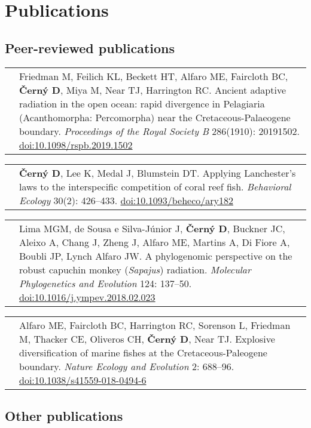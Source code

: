 \documentclass[10pt]{article}
\begin{document}
\section*{Publications}

\subsection*{Peer-reviewed publications}

\begin{tabularx}{\textwidth}{>{\raggedleft\arraybackslash}p{2.2cm} X}
2019 & Friedman M, Feilich KL, Beckett HT, Alfaro ME, Faircloth BC, \textbf{\v{C}ern\'{y} D}, Miya M, Near TJ, Harrington RC. Ancient adaptive radiation in the open ocean: rapid divergence in Pelagiaria (Acanthomorpha: Percomorpha) near the Cretaceous-Palaeogene boundary. \textit{Proceedings of the Royal Society B} 286(1910): 20191502. \href{http://doi.org/10.1098/rspb.2019.1502}{doi:10.1098/rspb.2019.1502}
\end{tabularx}
\begin{tabularx}{\textwidth}{>{\raggedleft\arraybackslash}p{2.2cm} X}
2018 & \textbf{\v{C}ern\'{y} D}, Lee K, Medal J, Blumstein DT. Applying Lanchester's laws to the interspecific competition of coral reef fish. \textit{Behavioral Ecology} 30(2): 426--433. \href{http://doi.org/10.1093/beheco/ary182}{doi:10.1093/beheco/ary182}
\end{tabularx}
\begin{tabularx}{\textwidth}{>{\raggedleft\arraybackslash}p{2.2cm} X}
2018 & Lima MGM, de Sousa e Silva-J\'{u}nior J, \textbf{\v{C}ern\'{y} D}, Buckner JC, Aleixo A, Chang J, Zheng J, Alfaro ME, Martins A, Di Fiore A, Boubli JP, Lynch Alfaro JW. A phylogenomic perspective on the robust capuchin monkey (\textit{Sapajus}) radiation. \textit{Molecular Phylogenetics and Evolution} 124: 137--50. \href{http://doi.org/10.1016/j.ympev.2018.02.023}{doi:10.1016/j.ympev.2018.02.023}
\end{tabularx}
\begin{tabularx}{\textwidth}{>{\raggedleft\arraybackslash}p{2.2cm} X}
2018 & Alfaro ME, Faircloth BC, Harrington RC, Sorenson L, Friedman M, Thacker CE, Oliveros CH, \textbf{\v{C}ern\'{y} D}, Near TJ. Explosive diversification of marine fishes at the Cretaceous-Paleogene boundary. \textit{Nature Ecology and Evolution} 2: 688--96. \href{http://doi.org/10.1038/s41559-018-0494-6}{doi:10.1038/s41559-018-0494-6}
\end{tabularx}

\subsection*{Other publications}
\end{document}
